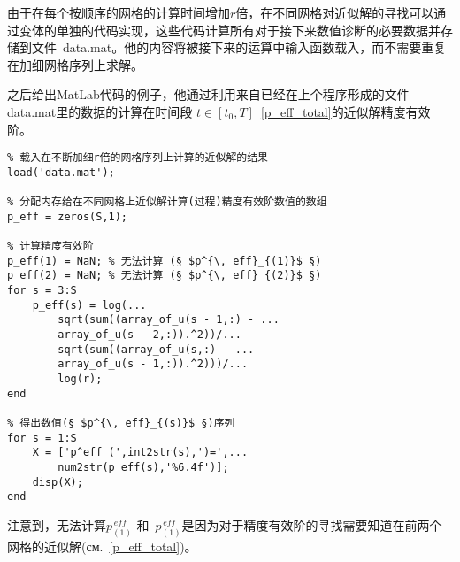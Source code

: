 \documentclass[twoside]{book}
\begin{document}
\begin{CJK*}{GBK}{song}
由于在每个按顺序的网格的计算时间增加$r$倍，在不同网格对近似解的寻找可以通过变体的单独的代码实现，这些代码计算所有对于接下来数值诊断的必要数据并存储到文件~data.mat。他的内容将被接下来的运算中输入函数载入，而不需要重复在加细网格序列上求解。


\newpage

之后给出MatLab代码的例子，他通过利用来自已经在上个程序形成的文件data.mat里的数据的计算在时间段 $t \in [t_0,T]$~\eqref{p_eff_total}的近似解精度有效阶。
%
\begin{lstlisting}
% 载入在不断加细r倍的网格序列上计算的近似解的结果
load('data.mat');

% 分配内存给在不同网格上近似解计算(过程)精度有效阶数值的数组
p_eff = zeros(S,1);

% 计算精度有效阶
p_eff(1) = NaN; % 无法计算 (§ $p^{\, eff}_{(1)}$ §)
p_eff(2) = NaN; % 无法计算 (§ $p^{\, eff}_{(2)}$ §)
for s = 3:S
    p_eff(s) = log(...
        sqrt(sum((array_of_u(s - 1,:) - ...
        array_of_u(s - 2,:)).^2))/...
        sqrt(sum((array_of_u(s,:) - ...
        array_of_u(s - 1,:)).^2)))/...
        log(r);
end

% 得出数值(§ $p^{\, eff}_{(s)}$ §)序列
for s = 1:S
    X = ['p^eff_(',int2str(s),')=',...
        num2str(p_eff(s),'%6.4f')];
    disp(X);
end
\end{lstlisting}

注意到，无法计算$p^{\, eff}_{(1)}$ 和~$p^{\, eff}_{(1)}$是因为对于精度有效阶的寻找需要知道在前两个网格的近似解(см.~\eqref{p_eff_total})。


\end{CJK*}
\end{document}
